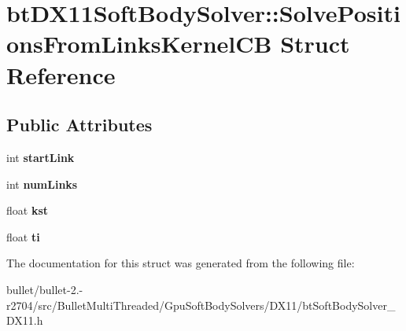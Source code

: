 \hypertarget{structbt_d_x11_soft_body_solver_1_1_solve_positions_from_links_kernel_c_b}{\section{bt\+D\+X11\+Soft\+Body\+Solver\+:\+:Solve\+Positions\+From\+Links\+Kernel\+C\+B Struct Reference}
\label{structbt_d_x11_soft_body_solver_1_1_solve_positions_from_links_kernel_c_b}
}
\subsection*{Public Attributes}
\begin{DoxyCompactItemize}
\item 
\hypertarget{structbt_d_x11_soft_body_solver_1_1_solve_positions_from_links_kernel_c_b_a0f538155ae9eeebef1c840aa786dd509}{int {\bfseries start\+Link}}\label{structbt_d_x11_soft_body_solver_1_1_solve_positions_from_links_kernel_c_b_a0f538155ae9eeebef1c840aa786dd509}

\item 
\hypertarget{structbt_d_x11_soft_body_solver_1_1_solve_positions_from_links_kernel_c_b_acd1e00e58ad5d02a159c343b3656c91a}{int {\bfseries num\+Links}}\label{structbt_d_x11_soft_body_solver_1_1_solve_positions_from_links_kernel_c_b_acd1e00e58ad5d02a159c343b3656c91a}

\item 
\hypertarget{structbt_d_x11_soft_body_solver_1_1_solve_positions_from_links_kernel_c_b_ac08f22d189978817fbb25c4b59531cef}{float {\bfseries kst}}\label{structbt_d_x11_soft_body_solver_1_1_solve_positions_from_links_kernel_c_b_ac08f22d189978817fbb25c4b59531cef}

\item 
\hypertarget{structbt_d_x11_soft_body_solver_1_1_solve_positions_from_links_kernel_c_b_a674fcc3660e393c8ca40eb760710a293}{float {\bfseries ti}}\label{structbt_d_x11_soft_body_solver_1_1_solve_positions_from_links_kernel_c_b_a674fcc3660e393c8ca40eb760710a293}

\end{DoxyCompactItemize}


The documentation for this struct was generated from the following file\+:\begin{DoxyCompactItemize}
\item 
bullet/bullet-\/2.-\/r2704/src/\+Bullet\+Multi\+Threaded/\+Gpu\+Soft\+Body\+Solvers/\+D\+X11/bt\+Soft\+Body\+Solver\+\_\+\+D\+X11.\+h\end{DoxyCompactItemize}
